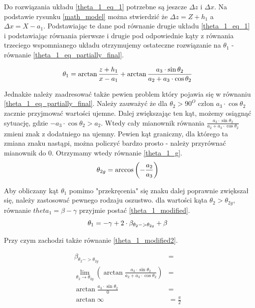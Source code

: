Do rozwiązania układu \ref{theta_1_eq_1} potrzebne są jeszcze $\Delta z$ i $\Delta x$. Na podstawie rysunku \ref{math_model} można stwierdzić że $\Delta z = Z + h_1$ a $\Delta x = X - a_1$. Podstawiając te dane pod równanie drugie układu \ref{theta_1_eq_1} i podstawiając równania pierwsze i drugie pod odpowiednie kąty z równania trzeciego wspomnianego układu otrzymujemy ostateczne rozwiązanie na $\theta_1$ - równanie \ref{theta_1_eq_partially_final}.

\begin{equation}\label{theta_1_eq_partially_final}
\theta_1 = \arctan{\frac{z + h_1}{x - a_1}} + \arctan{\frac{a_3 \cdot \sin{\theta_2}}{a_2 + a_3 \cdot{\cos{\theta_2}}}}\\ 
\end{equation}

Jednakże należy zaadresować także pewien problem który pojawia się w równaniu \ref{theta_1_eq_partially_final}. Należy zauważyć że dla $\theta_2 > 90^O$ człon $a_3 \cdot{\cos{\theta_2}}$ zacznie przyjmować wartości ujemne. Dalej zwiększając ten kąt, możemy osiągnąć sytuację, gdzie $- a_3 \cdot{\cos{\theta_2}} > a_2$. Wtedy cały mianownik równania $\frac{a_3 \cdot \sin{\theta_2}}{a_2 + a_3 \cdot{\cos{\theta_2}}}$ zmieni znak z dodatniego na ujemny. Pewien kąt graniczny, dla którego ta zmiana znaku nastąpi, można policzyć bardzo prosto - należy przyrównać mianownik do $0$. Otrzymamy wtedy równanie \ref{theta_1_g}.\\

\begin{equation} \label{theta_1_g}
\theta_{2g} = \arccos{\left(-\frac{a_2}{a_3}\right)}\\
\end{equation}

Aby obliczany kąt $\theta_1$ pomimo "przekręcenia" się znaku dalej poprawnie zwiększał się, należy zastosować pewnego rodzaju oszustwo. dla wartości kąta $\theta_2 > \theta_{2g}$, równanie $theta_1 = \beta - \gamma$ przyjmie postać \ref{theta_1_modified}.\\

\begin{equation} \label{theta_1_modified}
\theta_1 = - \gamma +  2 \cdot \beta_{\theta_2 -> \theta_{2g}} + \beta \\
\end{equation}

Przy czym zachodzi także równanie \ref{theta_1_modified2}.

\begin{equation} \label{theta_1_modified2}
\begin{split}
\beta_{\theta_2 -> \theta_{2g}} &=\\
\lim_{\theta_2 \to \theta_{2g}} \left( \arctan{\frac{a_3 \cdot \sin{\theta_2}}{a_2 + a_3 \cdot{\cos{\theta_2}}}} \right) &=\\
\arctan{\frac{a_3 \cdot \sin{\theta_2}}{0}} &=\\
\arctan{\infty} &= \frac{\pi}{2}\\
\end{split}
\end{equation}


